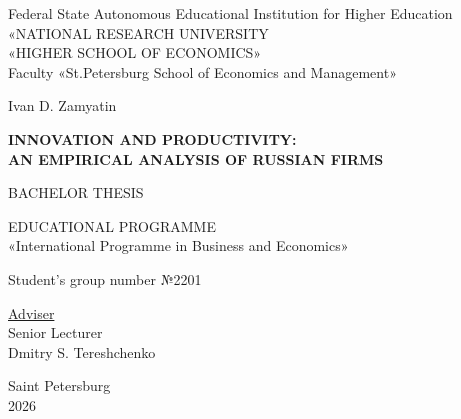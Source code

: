 \documentclass[a4paper, 12pt]{article}
\begin{document}
\begin{center}

Federal State Autonomous Educational Institution for Higher Education\\
«NATIONAL RESEARCH UNIVERSITY\\
«HIGHER SCHOOL OF ECONOMICS»\\[2ex]
Faculty «St.Petersburg School of Economics and Management»\par

\vspace{1.5cm}

{\large Ivan D. Zamyatin\par}

\vspace{1cm}

{\Large\bfseries
INNOVATION AND PRODUCTIVITY: \\ 
AN EMPIRICAL ANALYSIS OF RUSSIAN FIRMS
\par}

\vspace{0.8cm}

BACHELOR THESIS\par

\vspace{0.8cm}

\par

\vspace{1cm}

EDUCATIONAL PROGRAMME\\[1ex]
«International Programme in Business and Economics»\par

\vspace{0.5cm}

Student’s group number №2201\par


\vfill

\hfill
\parbox[t]{0.4\textwidth}{%
    \underline{Adviser}\\[1ex]
    Senior Lecturer\\[1ex]
    Dmitry S. Tereshchenko\\[1ex]
}%

\vfill\vfill

Saint Petersburg\\[1ex]
2026
\end{center}
\thispagestyle{empty}
\clearpage
\end{document}
